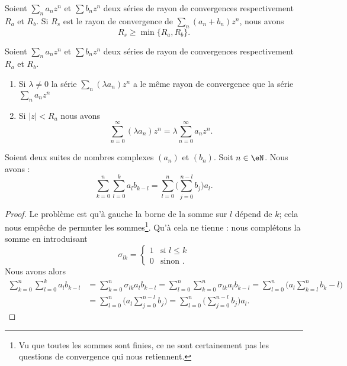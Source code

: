 \begin{theorem}\label{THOooSDQQooIawBOk}
	Soient \( \sum_na_nz^n\) et \( \sum b_nz^n\) deux séries de rayon de convergences respectivement \( R_a\) et \( R_b\).  Si \( R_s\) est le rayon de convergence de \( \sum_n(a_n+b_n)z^n\), nous avons
	\begin{equation}
		R_s\geq \min\{ R_a,R_b \}.
	\end{equation}
\end{theorem}

\begin{theorem}     \label{THOooINHDooZxErnp}
	Soient \( \sum_na_nz^n\) et \( \sum b_nz^n\) deux séries de rayon de convergences respectivement \( R_a\) et \( R_b\).
	\begin{enumerate}
		\item
		      Si \( \lambda\neq 0\) la série \( \sum_n(\lambda a_n)z^n\) a le même rayon de convergence que la série \( \sum_na_nz^n\)
		\item
		      Si \( | z |<R_a\) nous avons
		      \begin{equation}
			      \sum_{n=0}^{\infty}(\lambda a_n)z^n=\lambda\sum_{n=0}^{\infty}a_nz^n.
		      \end{equation}
	\end{enumerate}
\end{theorem}


\begin{lemma}       \label{LEMooNYAXooKUuQFe}
	Soient deux suites de nombres complexes \( (a_n)\) et \( (b_n)\). Soit \( n\in \eN\). Nous avons :
	\begin{equation}
		\sum_{k=0}^n\sum_{l=0}^ka_lb_{k-l}=\sum_{l=0}^n\big( \sum_{j=0}^{n-l}b_j \big)a_l.
	\end{equation}
\end{lemma}

\begin{proof}
	Le problème est qu'à gauche la borne de la somme sur \( l\) dépend de \( k\); cela nous empêche de permuter les sommes\footnote{Vu que toutes les sommes sont finies, ce ne sont certainement pas les questions de convergence qui nous retiennent.}. Qu'à cela ne tienne : nous complétons la somme en introduisant
	\begin{equation}
		\sigma_{lk}=\begin{cases}
			1 & \text{si } l\leq k \\
			0 & \text{sinon }.
		\end{cases}
	\end{equation}
	Nous avons alors
	\begin{subequations}
		\begin{align}
			\sum_{k=0}^n\sum_{l=0}^ka_lb_{k-l} & =\sum_{k=0}^n\sigma_{lk}a_lb_{k-l}=\sum_{l=0}^n\sum_{k=0}^n\sigma_{lk}a_lb_{k-l} =\sum_{l=0}^n\big( a_l\sum_{k=l}^nb_k-l \big) \\
			                                   & =\sum_{l=0}^n\big( a_l\sum_{j=0}^{n-l}b_j \big)=\sum_{l=0}^n\big( \sum_{j=0}^{n-l}b_j \big)a_l.
		\end{align}
	\end{subequations}
\end{proof}


